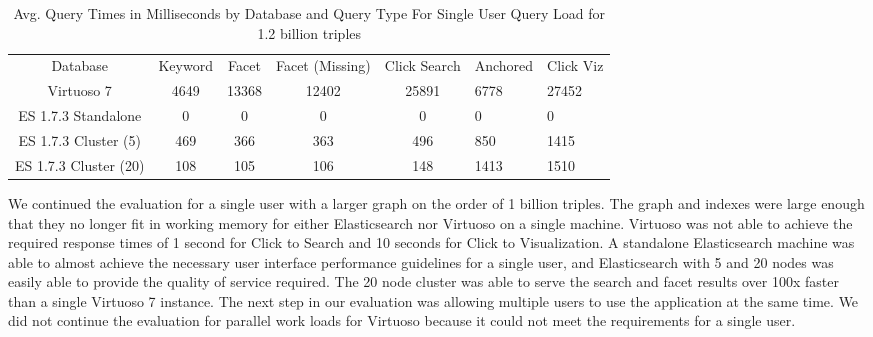 \begin{table} 
    \begin{tabular}{ c c c c c }
        Database & Keyword & Facet & Facet (Missing) & Click Search & Anchored & Click Viz \\ 
        Virtuoso 7 & 4649 & 13368 & 12402 & 25891 & 6778 &  27452 \\ 
        ES 1.7.3 Standalone & 0 & 0 & 0 & 0 & 0 & 0 \\ 
        ES 1.7.3 Cluster (5) & 469 & 366 & 363 & 496 & 850 & 1415 \\ 
        ES 1.7.3 Cluster (20) & 108 & 105 & 106 & 148 & 1413 & 1510 \\ 
    \end{tabular} 
    \caption{Avg. Query Times in Milliseconds by Database and Query Type For Single User Query Load for 1.2 billion triples}
    \label{table:qt_single_user_1b}
\end{table}

We continued the evaluation for a single user with a larger graph on the order of 1 billion triples.  
The graph and indexes were large enough that they no longer fit in working memory for either Elasticsearch nor Virtuoso on a single machine.
Virtuoso was not able to achieve the required response times of 1 second for Click to Search and 10 seconds for Click to Visualization.
A standalone Elasticsearch machine was able to almost achieve the necessary user interface performance guidelines for a single user, and Elasticsearch with 5 and 20 nodes was easily able to provide the quality of service required.  
The 20 node cluster was able to serve the search and facet results over 100x faster than a single Virtuoso 7 instance. 
The next step in our evaluation was allowing multiple users to use the application at the same time.
We did not continue the evaluation for parallel work loads for Virtuoso because it could not meet the requirements for a single user.

